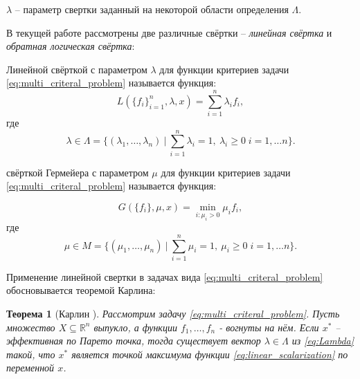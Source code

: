 	$\lambda$ – параметр свертки заданный на некоторой
области определения $\Lambda$.
\newline

В текущей работе рассмотрены две различные свёртки --
\textit{линейная свёртка} и \textit{обратная логическая свёртка}:

\begin{Def}
	Линейной свёрткой с параметром $\lambda$ для функции критериев задачи
	\eqref{eq:multi_criteral_problem} называется функция:
	\begin{equation}
		L(\{f_i\}_{i=1}^{n}, \lambda, x) = 
		\sum_{i=1}^{n} \lambda_i f_i,
		\label{eq:linear_scalarization}
	\end{equation}
	где  
	\begin{equation}
		\lambda \in 
		\Lambda = \{
			(\lambda_1, \ldots, \lambda_n) \:
			| \: \sum_{i=1}^n \lambda_i = 1, \: 
			  \lambda_i \geq 0 \; i = 1, \ldots n 
		\}.		
		\label{eq:Lambda}
	\end{equation}
\end{Def}

\begin{Def}
	свёрткой Гермейера с параметром $\mu$ для 
	функции критериев задачи \eqref{eq:multi_criteral_problem}
	называется функция:
	
	\begin{equation}
		G(\{f_i\}, \mu, x)=
		\min \limits_{i: \mu_i > 0} \mu_i f_i,
		\label{eq:germeyer_scalarization}	
	\end{equation}
	где 
	\begin{equation}
		\mu \in 
		M = \{
			(\mu_1, \ldots, \mu_n) \:
			| \: \sum_{i=1}^n \mu_i = 1, \: 
			  \mu_i \geq 0 \; i = 1, \ldots n 
		\}.
		\label{eq:Mu}	
	\end{equation}
\end{Def}

Применение линейной свертки в задачах вида
\eqref{eq:multi_criteral_problem} обосновывается теоремой Карлина:

\newtheorem{Th}{Теорема}
\begin{Th}[Карлин \cite{carlin}]
	Рассмотрим задачу \eqref{eq:multi_criteral_problem}. 
	Пусть множество $X \subseteq \mathbb{R}^n$ выпукло,
	а функции $f_1, \ldots, f_n$ - вогнуты на нём.
	Если $x^*$ – эффективная по Парето точка,
    тогда существует вектор $\lambda \in \Lambda$ из 
    \eqref{eq:Lambda} такой, что $x^*$ является точкой 
    максимума функции \eqref{eq:linear_scalarization} по переменной
    $x$.   
\end{Th}


